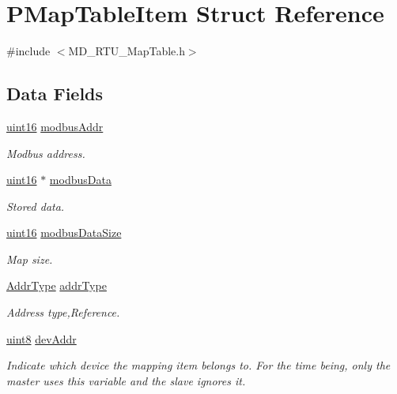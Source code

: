 \hypertarget{struct_p_map_table_item}{}\section{P\+Map\+Table\+Item Struct Reference}
\label{struct_p_map_table_item}


{\ttfamily \#include $<$M\+D\+\_\+\+R\+T\+U\+\_\+\+Map\+Table.\+h$>$}

\subsection*{Data Fields}
\begin{DoxyCompactItemize}
\item 
\mbox{\hyperlink{_m_d___r_t_u___type_8h_a05f6b0ae8f6a6e135b0e290c25fe0e4e}{uint16}} \mbox{\hyperlink{struct_p_map_table_item_aaa9fbc3062ec6213a5b91318077881d0}{modbus\+Addr}}
\begin{DoxyCompactList}\small\item\em Modbus address. \end{DoxyCompactList}\item 
\mbox{\hyperlink{_m_d___r_t_u___type_8h_a05f6b0ae8f6a6e135b0e290c25fe0e4e}{uint16}} $\ast$ \mbox{\hyperlink{struct_p_map_table_item_a865f14cfddaf31e0868812dcb43f3a05}{modbus\+Data}}
\begin{DoxyCompactList}\small\item\em Stored data. \end{DoxyCompactList}\item 
\mbox{\hyperlink{_m_d___r_t_u___type_8h_a05f6b0ae8f6a6e135b0e290c25fe0e4e}{uint16}} \mbox{\hyperlink{struct_p_map_table_item_a316475ec03756ea413b4887594e05e93}{modbus\+Data\+Size}}
\begin{DoxyCompactList}\small\item\em Map size. \end{DoxyCompactList}\item 
\mbox{\hyperlink{_m_d___r_t_u___map_table_8h_a5a2ca199266aafd1a2d30391d6620892}{Addr\+Type}} \mbox{\hyperlink{struct_p_map_table_item_a2d1a1a7dddf870379b724a411683484a}{addr\+Type}}
\begin{DoxyCompactList}\small\item\em Address type,Reference. \end{DoxyCompactList}\item 
\mbox{\hyperlink{_m_d___r_t_u___type_8h_adde6aaee8457bee49c2a92621fe22b79}{uint8}} \mbox{\hyperlink{struct_p_map_table_item_a3e1d7e4094f9c89a5f02dc3a5097864e}{dev\+Addr}}
\begin{DoxyCompactList}\small\item\em Indicate which device the mapping item belongs to. For the time being, only the master uses this variable and the slave ignores it. \end{DoxyCompactList}\end{DoxyCompactItemize}


